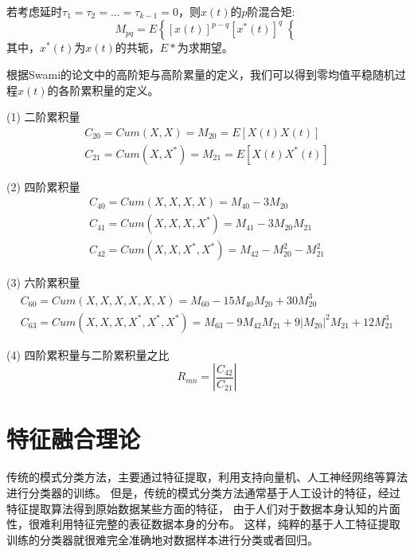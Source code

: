 若考虑延时$\tau_1 = \tau_2 = ... = \tau_{k-1} = 0$，则$x(t)$的$p$阶混合矩:
\begin{equation}
\label{eqt_4_9}
M_{pq} = E\left\lbrace \left[ x(t)\right]^{p-q} 
\left[ x^*(t)\right]^{q}\right\lbrace 
\end{equation}
其中，$x^*(t)$为$x(t)$的共轭，$E{*}$为求期望。\par
根据Swami\cite{swami2000hierarchical}的论文中的高阶矩与高阶累量的定义，我们可以得到零均值平稳随机过程$x(t)$的各阶累积量的定义。

(1) 二阶累积量
\begin{equation}
\label{eqt_4_10}
\begin{aligned}
C_{20} = Cum(X, X) = M_{20} = E[X(t)X(t)]\\
C_{21} = Cum(X, X^*) = M_{21} = E[X(t)X^*(t)]	
\end{aligned}
\end{equation}

(2) 四阶累积量
\begin{equation}
\label{eqt_4_11}
\begin{aligned}
C_{40}=Cum(X, X, X, X) = M_{40} - 3M_{20}\\
C_{41}=Cum(X, X, X, X^*) = M_{41} - 3M_{20}M_{21}\\
C_{42}=Cum(X, X, X^*, X^*) = M_{42} - M_{20}^2 - M_{21}^2
\end{aligned}
\end{equation}

(3) 六阶累积量
\begin{equation}
\label{eqt_4_12}
\begin{aligned}
C_{60}=Cum(X, X, X, X, X, X) = M_{60} - 15M_{40}M_{20} + 30M_{20}^3\\
C_{63}=Cum(X, X, X, X^*, X^*, X^*) = M_{63} - 9M_{42}M_{21} 
+ 9\left|M_{20}\right|^2M_{21} + 12M_{21}^3
\end{aligned}
\end{equation}

(4) 四阶累积量与二阶累积量之比
\begin{equation}
\label{eqt_4_13}
R_{mn} = |\frac{C_{42}}{C_{21}}|
\end{equation}

\section{特征融合理论}
传统的模式分类方法，主要通过特征提取，利用支持向量机、人工神经网络等算法进行分类器的训练。 
但是，传统的模式分类方法通常基于人工设计的特征，经过特征提取算法得到原始数据某些方面的特征，
由于人们对于数据本身认知的片面性，很难利用特征完整的表征数据本身的分布。
这样，纯粹的基于人工特征提取训练的分类器就很难完全准确地对数据样本进行分类或者回归。\par

